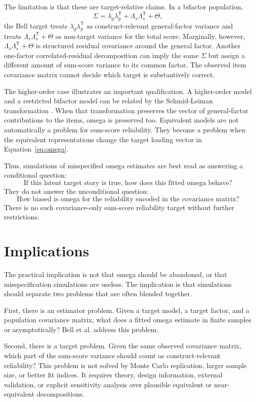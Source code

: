 \documentclass[11pt]{article}
\newcommand{\T}{^{\mathsf T}}
\begin{document}
The limitation is that these are target-relative claims. In a bifactor
population,
\[
  \Sigma=\lambda_g\lambda_g\T+\Lambda_s\Lambda_s\T+\Theta ,
\]
the Bell target treats \(\lambda_g\lambda_g\T\) as construct-relevant
general-factor variance and treats \(\Lambda_s\Lambda_s\T+\Theta\) as
non-target variance for the total score. Marginally, however,
\(\Lambda_s\Lambda_s\T+\Theta\) is structured residual covariance around the
general factor. Another one-factor correlated-residual decomposition can imply
the same \(\Sigma\) but assign a different amount of sum-score variance to its
common factor. The observed item covariance matrix cannot decide which target
is substantively correct.

The higher-order case illustrates an important qualification. A higher-order
model and a restricted bifactor model can be related by the Schmid-Leiman
transformation \cite{schmid1957,yung1999}. When that transformation preserves
the vector of general-factor contributions to the items, omega is preserved too.
Equivalent models are not automatically a problem for sum-score reliability.
They become a problem when the equivalent representations change the target
loading vector in Equation~\eqref{eq:omega}.

Thus, simulations of misspecified omega estimates are best read as answering a
conditional question:
\[
  \text{If this latent target story is true, how does this fitted omega behave?}
\]
They do not answer the unconditional question:
\[
  \text{How biased is omega for the reliability encoded in the covariance matrix?}
\]
There is no such covariance-only sum-score reliability target without further
restrictions.

\section{Implications}

The practical implication is not that omega should be abandoned, or that
misspecification simulations are useless. The implication is that simulations
should separate two problems that are often blended together.

First, there is an estimator problem. Given a target model, a target factor, and
a population covariance matrix, what does a fitted omega estimate in finite
samples or asymptotically? Bell et al. address this problem.

Second, there is a target problem. Given the same observed covariance matrix,
which part of the sum-score variance should count as construct-relevant
reliability? This problem is not solved by Monte Carlo replication, larger
sample size, or better fit indices. It requires theory, design information,
external validation, or explicit sensitivity analysis over plausible equivalent
or near-equivalent decompositions.
\end{document}
